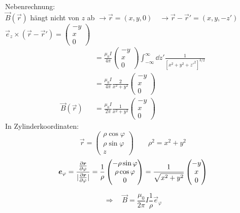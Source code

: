 Nebenrechnung:\\
$ \vec{B}(\vec{r}) $ hängt nicht von $ z $ ab $ \rightarrow \vec{r} = (x,y,0) \quad \rightarrow \vec{r} - \vec{r}' = (x,y,-z') $\\
$ \vec{e}_z \times (\vec{r} - \vec{r}') = \begin{pmatrix}
-y \\ x \\ 0
\end{pmatrix} $
\begin{align*}
\qquad \qquad &= \frac{\mu_0 I}{4 \pi} \begin{pmatrix}
-y \\ x \\ 0
\end{pmatrix} \int_{-\infty}^{\infty} \dd z' \frac{1}{[x^2 + y^2 + z'^2]^{3/2}}\\
&= \frac{\mu_0 I}{4 \pi} \frac{2}{x^2 + y^2} \begin{pmatrix}
-y \\ x \\ 0
\end{pmatrix}\\
\vec{B} (\vec{r}) &= \frac{\mu_0 I}{2 \pi} \frac{1}{x^2 + y^2} \begin{pmatrix}
-y \\ x \\ 0
\end{pmatrix}
\end{align*}
In Zylinderkoordinaten:
\begin{equation*}
\vec{r} = \begin{pmatrix}
\rho \cos \varphi \\ \rho \sin \varphi \\ z
\end{pmatrix} \qquad \rho^2 = x^2 + y^2
\end{equation*}
\begin{equation*}
\bm{e}_{\varphi} = \frac{\frac{\partial \bm{r}}{\partial \varphi}}{|\frac{\partial \bm{r}}{\partial \varphi}|} = \frac{1}{\rho} \begin{pmatrix}
- \rho \sin \varphi \\ \rho \cos \varphi \\ 0
\end{pmatrix} = \frac{1}{\sqrt{x^2 + y^2}} \begin{pmatrix}
-y \\ x \\ 0
\end{pmatrix}
\end{equation*}
\begin{minipage}{.5\linewidth}
	\begin{equation*}
	\Rightarrow \quad \vec{B} = \frac{\mu_0}{2 \pi} I \frac{1}{\rho} \vec{e}_{\varphi}
	\end{equation*}
\end{minipage}%
